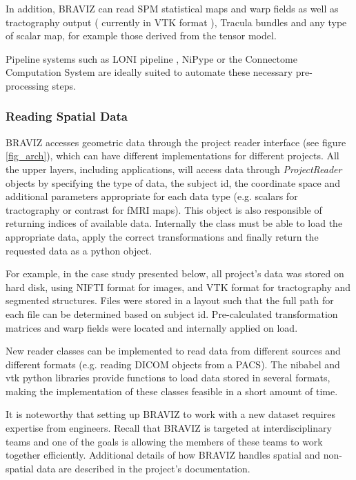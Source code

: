 \documentclass{frontiersHLTH}
\begin{document}
In addition, BRAVIZ can read SPM statistical maps and warp fields as well as tractography output ( currently in VTK format ), Tracula bundles and any type of scalar map, for example those derived from the tensor model.

Pipeline systems such as LONI pipeline \cite{dinov_efficient_2009}, NiPype \cite{gorgolewski_nipype:_2011} or the Connectome Computation System \cite{xu_connectome_2015} are ideally suited to automate these necessary pre-processing steps.

\subsubsection{Reading Spatial Data}

BRAVIZ accesses geometric data through the project reader interface (see figure \ref{fig_arch}), which can have different implementations for different projects. All the upper layers, including applications, will access data through \emph{ProjectReader} objects by specifying the type of data, the subject id, the coordinate space  and additional parameters appropriate for each data type (e.g. scalars for tractography or contrast for fMRI maps). This object is also responsible of returning indices of available data. Internally the class must be able to load the appropriate data, apply the correct transformations and finally return the requested data as a python object. 

For example, in the case study presented below, all project's data was stored on hard disk, using NIFTI format for images, and VTK format for tractography and segmented structures. Files were stored in a layout such that the full path for each file can be determined based on subject id. Pre-calculated transformation matrices and warp fields were located and internally applied on load.

New reader classes can be implemented to read data from different sources and different formats (e.g. reading DICOM objects from a PACS). The nibabel and vtk python libraries provide functions to load data stored in several formats, making the implementation of these classes feasible in a short amount of time.

It is noteworthy that setting up BRAVIZ to work with a new dataset requires expertise from engineers. Recall that BRAVIZ is targeted at interdisciplinary teams and one of the goals is allowing the members of these teams to work together efficiently. Additional details of how BRAVIZ handles spatial and non-spatial data are described in the project's documentation. 
\end{document}
